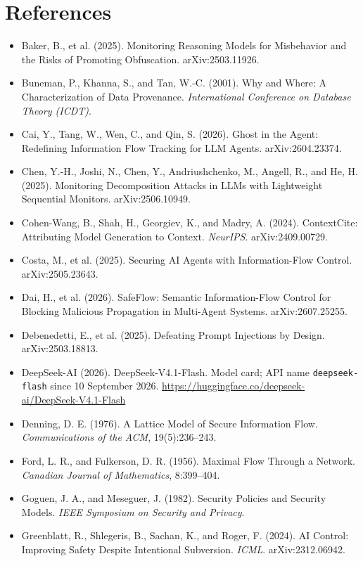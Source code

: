 \documentclass[11pt, a4paper]{article}
\begin{document}
\section*{References}
\begin{itemize}
  \item Baker, B., et al. (2025). Monitoring Reasoning Models for Misbehavior and the Risks of Promoting Obfuscation. arXiv:2503.11926.
  \item Buneman, P., Khanna, S., and Tan, W.-C. (2001). Why and Where: A Characterization of Data Provenance. \emph{International Conference on Database Theory (ICDT)}.
  \item Cai, Y., Tang, W., Wen, C., and Qin, S. (2026). Ghost in the Agent: Redefining Information Flow Tracking for LLM Agents. arXiv:2604.23374.
  \item Chen, Y.-H., Joshi, N., Chen, Y., Andriushchenko, M., Angell, R., and He, H. (2025). Monitoring Decomposition Attacks in LLMs with Lightweight Sequential Monitors. arXiv:2506.10949.
  \item Cohen-Wang, B., Shah, H., Georgiev, K., and Madry, A. (2024). ContextCite: Attributing Model Generation to Context. \emph{NeurIPS}. arXiv:2409.00729.
  \item Costa, M., et al. (2025). Securing AI Agents with Information-Flow Control. arXiv:2505.23643.
  \item Dai, H., et al. (2026). SafeFlow: Semantic Information-Flow Control for Blocking Malicious Propagation in Multi-Agent Systems. arXiv:2607.25255.
  \item Debenedetti, E., et al. (2025). Defeating Prompt Injections by Design. arXiv:2503.18813.
  \item DeepSeek-AI (2026). DeepSeek-V4.1-Flash. Model card; API name \texttt{deepseek-flash} since 10 September 2026. \url{https://huggingface.co/deepseek-ai/DeepSeek-V4.1-Flash}
  \item Denning, D. E. (1976). A Lattice Model of Secure Information Flow. \emph{Communications of the ACM}, 19(5):236--243.
  \item Ford, L. R., and Fulkerson, D. R. (1956). Maximal Flow Through a Network. \emph{Canadian Journal of Mathematics}, 8:399--404.
  \item Goguen, J. A., and Meseguer, J. (1982). Security Policies and Security Models. \emph{IEEE Symposium on Security and Privacy}.
  \item Greenblatt, R., Shlegeris, B., Sachan, K., and Roger, F. (2024). AI Control: Improving Safety Despite Intentional Subversion. \emph{ICML}. arXiv:2312.06942.

\end{itemize}
\end{document}
